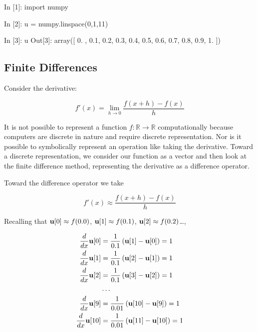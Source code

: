 \documentclass[12pt,]{book}
\newenvironment{Shaded}{}{}
\newcommand{\DecValTok}[1]{\textcolor[rgb]{0.25,0.63,0.44}{{#1}}}
\newcommand{\FloatTok}[1]{\textcolor[rgb]{0.25,0.63,0.44}{{#1}}}
\newcommand{\ImportTok}[1]{{#1}}
\newcommand{\OperatorTok}[1]{\textcolor[rgb]{0.40,0.40,0.40}{{#1}}}
\newcommand{\NormalTok}[1]{{#1}}
\begin{document}
\begin{Shaded}
\begin{Highlighting}[]
\NormalTok{In [}\DecValTok{1}\NormalTok{]: }\ImportTok{import} \NormalTok{numpy}

\NormalTok{In [}\DecValTok{2}\NormalTok{]: u }\OperatorTok{=} \NormalTok{numpy.linspace(}\DecValTok{0}\NormalTok{,}\DecValTok{1}\NormalTok{,}\DecValTok{11}\NormalTok{)}

\NormalTok{In [}\DecValTok{3}\NormalTok{]: u}
\NormalTok{Out[}\DecValTok{3}\NormalTok{]: array([ }\DecValTok{0}\NormalTok{. ,  }\FloatTok{0.1}\NormalTok{,  }\FloatTok{0.2}\NormalTok{,  }\FloatTok{0.3}\NormalTok{,  }\FloatTok{0.4}\NormalTok{,  }\FloatTok{0.5}\NormalTok{,  }\FloatTok{0.6}\NormalTok{,  }\FloatTok{0.7}\NormalTok{,  }\FloatTok{0.8}\NormalTok{,  }\FloatTok{0.9}\NormalTok{,  }\DecValTok{1}\NormalTok{. ])}
\end{Highlighting}
\end{Shaded}

\subsection{Finite Differences}\label{finite-differences}

Consider the derivative:

\begin{equation}f'(x)=\lim_{h\to 0} \frac{f(x+h)-f(x)}{h}\label{eq:first_derivative}\end{equation}

It is not possible to represent a function
\(f: \mathbb{R} \to \mathbb{R}\) computationally because computers are
discrete in nature and require discrete representation. Nor is it
possible to symbolically represent an operation like taking the
derivative. Toward a discrete representation, we consider our function
as a vector and then look at the finite difference method, representing
the derivative as a difference operator.

Toward the difference operator we take

\begin{equation}f'(x)\approx \frac{f(x+h)-f(x)}{h}\label{eq:first_difference}\end{equation}

Recalling that \(\mathbf{u}[0]\approx f(0.0)\), \(\mathbf{u}[1]\approx f(0.1)\),
\(\mathbf{u}[2]\approx f(0.2)\)\dots,

\begin{align*}
\frac{d}{dx}\mathbf{u}[0] &= \frac{1}{0.1}\left(\mathbf{u}[1] -\mathbf{u}[0]\right) = 1\\
\frac{d}{dx}\mathbf{u}[1] &= \frac{1}{0.1}\left(\mathbf{u}[2] -\mathbf{u}[1]\right) = 1\\
\frac{d}{dx}\mathbf{u}[2] &= \frac{1}{0.1}\left(\mathbf{u}[3] -\mathbf{u}[2]\right) = 1\\
&\dots\\
\frac{d}{dx}\mathbf{u}[9] &= \frac{1}{0.01}\left(\mathbf{u}[10] -\mathbf{u}[9]\right) = 1\\
\frac{d}{dx}\mathbf{u}[10] &= \frac{1}{0.01}\left(\mathbf{u}[11] -\mathbf{u}[10]\right) = 1\\
\end{align*}
\end{document}
